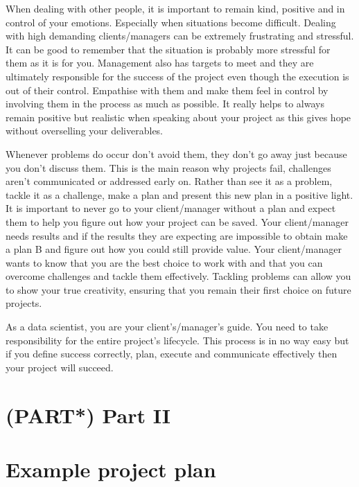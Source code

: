 \documentclass[
]{book}
\begin{document}
When dealing with other people, it is important to remain kind, positive
and in control of your emotions. Especially when situations become
difficult. Dealing with high demanding clients/managers can be extremely
frustrating and stressful. It can be good to remember that the situation
is probably more stressful for them as it is for you. Management also
has targets to meet and they are ultimately responsible for the success
of the project even though the execution is out of their control.
Empathise with them and make them feel in control by involving them in
the process as much as possible. It really helps to always remain
positive but realistic when speaking about your project as this gives
hope without overselling your deliverables.

Whenever problems do occur don't avoid them, they don't go away just
because you don't discuss them. This is the main reason why projects
fail, challenges aren't communicated or addressed early on. Rather than
see it as a problem, tackle it as a challenge, make a plan and present
this new plan in a positive light. It is important to never go to your
client/manager without a plan and expect them to help you figure out how
your project can be saved. Your client/manager needs results and if the
results they are expecting are impossible to obtain make a plan B and
figure out how you could still provide value. Your client/manager wants
to know that you are the best choice to work with and that you can
overcome challenges and tackle them effectively. Tackling problems can
allow you to show your true creativity, ensuring that you remain their
first choice on future projects.

As a data scientist, you are your client's/manager's guide. You need to
take responsibility for the entire project's lifecycle. This process is
in no way easy but if you define success correctly, plan, execute and
communicate effectively then your project will succeed.

\hypertarget{part-part-ii}{%
\chapter*{(PART*) Part II}\label{part-part-ii}}

\hypertarget{example}{%
\chapter{Example project plan}\label{example}}
\end{document}

